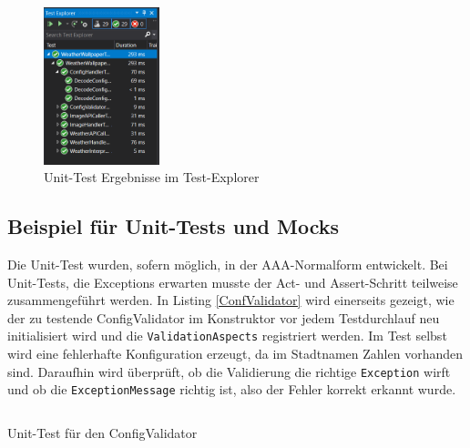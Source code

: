 \begin{figure}[ht]
\centering
\includegraphics[width=0.3\textwidth]{Bilder/TestExplorer}
\caption[Unit-Test Ergebnisse im Test-Explorer]{\label{TestExplorer} Unit-Test Ergebnisse im Test-Explorer}
\end{figure}
\subsection{Beispiel für Unit-Tests und Mocks}
Die Unit-Test wurden, sofern möglich, in der AAA-Normalform entwickelt. Bei Unit-Tests, die Exceptions erwarten musste der Act- und Assert-Schritt teilweise zusammengeführt werden. In Listing \ref{ConfValidator} wird einerseits gezeigt, wie der zu testende ConfigValidator im Konstruktor vor jedem Testdurchlauf neu initialisiert wird und die \texttt{ValidationAspects} registriert werden. Im Test selbst wird eine fehlerhafte Konfiguration erzeugt, da im Stadtnamen Zahlen vorhanden sind. Daraufhin wird überprüft, ob die Validierung die richtige \texttt{Exception} wirft und ob die \texttt{ExceptionMessage} richtig ist, also der Fehler korrekt erkannt wurde.

\begin{listing}[h]
\inputminted[linenos=true,frame=lines]{csharp}{Listings/ConfigValidatorTest.cs}
\caption{Unit-Test für den ConfigValidator}
\label{ConfValidator}
\end{listing}

